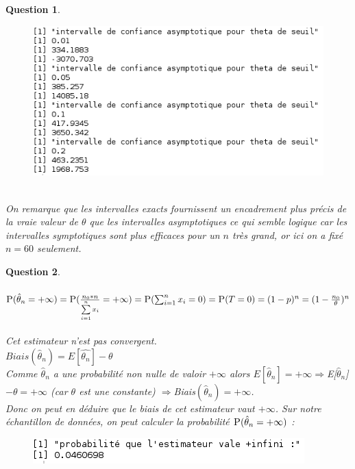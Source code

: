\documentclass[a4paper,11pt]{article}
\newtheorem{exo1}{Question}
\begin{document}
\begin{exo1}
\begin{figure}[h]
\end{figure}
\begin{figure}[h]
\includegraphics[scale=0.7]{images/Q1_4_asymp.png}
\end{figure} \ \\
On remarque que les intervalles exacts fournissent un encadrement plus précis de la vraie valeur de $\theta$ que les intervalles asymptotiques ce qui semble logique car les intervalles symptotiques sont plus efficaces pour un $n$ très grand, or ici on a fixé $n=60$ seulement.
\end{exo1}

\begin{exo1} \ \\ \\
$\textsc{P}(\hat{\theta}_{n}=+\infty) = \textsc{P}(\frac{n_{0}*n}{\sum\limits_{i=1}^{n} x_{i}}=+\infty) = \textsc{P}(\sum_{i=1}^{n} x_{i}=0) = \textsc{P}(T=0) = (1-p)^n = (1-\frac{n_{0}}{\theta})^n$ \ \\
Cet estimateur n'est pas convergent. \ \\
$Biais(\hat{\theta}_{n}) = E[\hat{\theta_{n}}]-\theta$ \ \\
Comme $\hat{\theta}_{n}$ a une probabilité non nulle de valoir $+\infty$ alors $E[\hat{\theta}_{n}]=+\infty \Rightarrow $E[$\hat{\theta}_{n}$]$-\theta = +\infty$ (car $\theta$ est une constante) $\Rightarrow $Biais$(\hat{\theta}_{n}) = +\infty$. \ \\
Donc on peut en déduire que le biais de cet estimateur vaut $+\infty$.
Sur notre échantillon de données, on peut calculer la probabilité $\textsc{P}(\hat{\theta}_{n}=+\infty)$ :
\begin{figure}[h]
\includegraphics[scale=0.7]{images/Q1_5.png}
\end{figure} \ \\
\end{exo1}
\end{document}
